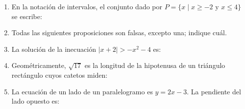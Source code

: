 \documentclass[11pt]{article}
\begin{document}
\begin{enumerate}
\item En la notación de intervalos, el conjunto dado por $P = \{x \mid x \geq -2 \text{ y } x \leq 4\}$ se escribe:
\begin{opciones}
\item $(-\infty, -2] \cup [4, \infty)$
\item $[-2, 4]$
\item $[4, -2]$
\item $[-2, \infty)$
\end{opciones}

\item Todas las siguientes proposiciones son falsas, excepto una; indique cuál.

\item La solución de la inecuación $|x + 2| > -x^2 - 4$ es:

\item Geométricamente, $\sqrt{17}$ es la longitud de la hipotenusa de un triángulo rectángulo cuyos catetos miden:

\item La ecuación de un lado de un paralelogramo es $y = 2x - 3$. La pendiente del lado opuesto es:


\end{enumerate}
\end{document}
